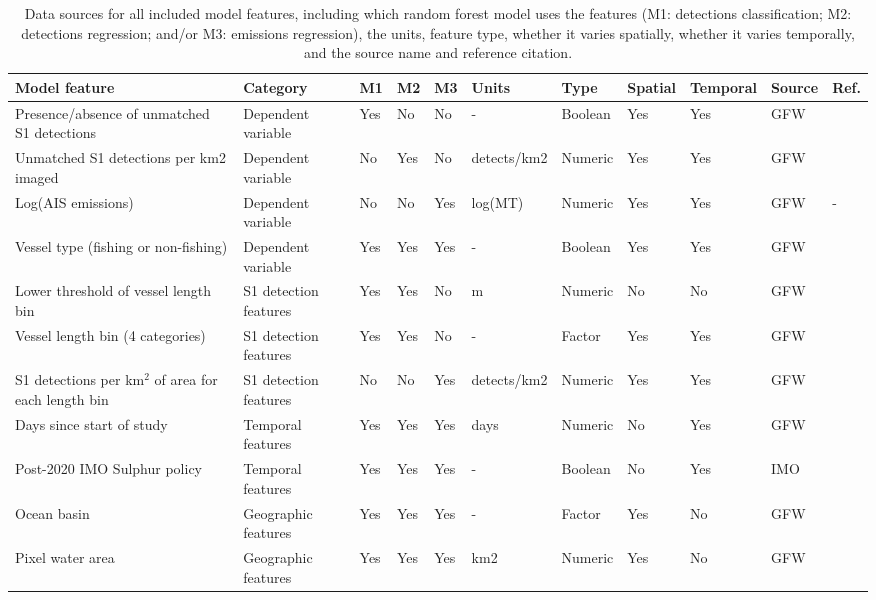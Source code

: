 \begin{table}[!h]
\centering
\caption{\label{tab:data_sources}Data sources for all included model features, including which random forest model uses the features (M1: detections classification; M2: detections regression; and/or M3: emissions regression), the units, feature type, whether it varies spatially, whether it varies temporally, and the source name and reference citation.}
\centering
\fontsize{4}{6}\selectfont
\begin{tabular}[t]{lllllllllll}
\toprule
Model feature & Category & M1 & M2 & M3 & Units & Type & Spatial & Temporal & Source & Ref.\\
\midrule
Presence/absence of unmatched S1 detections & Dependent variable & Yes & No & No & - & Boolean & Yes & Yes & GFW & \cite{paolo2024satellite}\\
Unmatched S1 detections per km2 imaged & Dependent variable & No & Yes & No & detects/km2 & Numeric & Yes & Yes & GFW & \cite{paolo2024satellite}\\
Log(AIS emissions) & Dependent variable & No & No & Yes & log(MT) & Numeric & Yes & Yes & GFW & -\\
Vessel type (fishing or non-fishing) & Dependent variable & Yes & Yes & Yes & - & Boolean & Yes & Yes & GFW & \cite{paolo2024satellite}\\
Lower threshold of vessel length bin & S1 detection features & Yes & Yes & No & m & Numeric & No & No & GFW & \cite{paolo2024satellite}\\
\addlinespace
Vessel length bin (4 categories) & S1 detection features & Yes & Yes & No & - & Factor & Yes & Yes & GFW & \cite{paolo2024satellite}\\
S1 detections per km$^2$ of area for each length bin & S1 detection features & No & No & Yes & detects/km2 & Numeric & Yes & Yes & GFW & \cite{paolo2024satellite}\\
Days since start of study & Temporal features & Yes & Yes & Yes & days & Numeric & No & Yes & GFW & \cite{kroodsma2018tracking}\\
Post-2020 IMO Sulphur policy & Temporal features & Yes & Yes & Yes & - & Boolean & No & Yes & IMO & \cite{imo_sulphur_2020}\\
Ocean basin & Geographic features  & Yes & Yes & Yes & - & Factor & Yes & No & GFW & \cite{kroodsma2018tracking}\\
\addlinespace
Pixel water area & Geographic features  & Yes & Yes & Yes & km2 & Numeric & Yes & No & GFW & \cite{paolo2024satellite}\\

\end{tabular}
\end{table}
